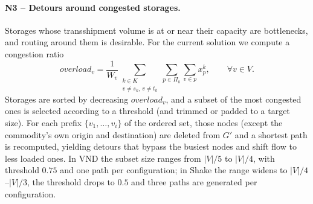 \documentclass[runningheads]{llncs}
\newcommand{\Vv}{V}
\begin{document}
\paragraph{N3 -- Detours around congested storages.}
Storages whose transshipment volume is at or near their capacity are
bottlenecks, and routing around them is desirable. For the current solution we
compute a congestion ratio
\begin{equation}
overload_v=\frac1{W_v}\sum_{\substack{k\in K\\ v\neq s_k,\,v\neq t_k}}
\sum_{p\in\Pi_k}\sum_{v\in p} x^k_p, \qquad \forall v\in \Vv .
\end{equation}
Storages are sorted by decreasing $overload_v$, and a subset of the most
congested ones is selected according to a threshold (and trimmed or padded to a
target size). For each prefix $\{v_1,\dots,v_i\}$ of the ordered set, those
nodes (except the commodity's own origin and destination) are deleted from
$G'$ and a shortest path is recomputed, yielding detours that bypass the
busiest nodes and shift flow to less loaded ones. In VND the subset size ranges
from $|\Vv|/5$ to $|\Vv|/4$, with threshold $0.75$ and one path per
configuration; in Shake the range widens to $|\Vv|/4$--$|\Vv|/3$, the threshold
drops to $0.5$ and three paths are generated per configuration.

\begin{algorithm}[t]
\DontPrintSemicolon
{}
\caption{\texttt{ProcessNeighborhood}: enlarge the path pool, re-optimise the
flows by MILP, and keep the move iff it improves the objective.}
\label{alg:pn}
\end{algorithm}
\end{document}
